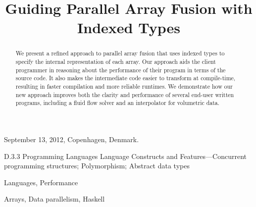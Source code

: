 \documentclass{sigplanconf}
\begin{document}
\title	{Guiding Parallel Array Fusion with Indexed Types}


 {September 13, 2012, Copenhagen, Denmark.}

\maketitle
\makeatactive


\begin{abstract}
We present a refined approach to parallel array fusion that uses indexed types to specify the internal representation of each array. Our approach aids the client programmer in reasoning about the performance of their program in terms of the source code. It also makes the intermediate code easier to transform at compile-time, resulting in faster compilation and more reliable runtimes. We demonstrate how our new approach improves both the clarity and performance of several end-user written programs, including a fluid flow solver and an interpolator for volumetric data.
\end{abstract}

\category
	{D.3.3}
	{Programming Languages}
	{Language Constructs and Features---Concurrent programming structures; Polymorphism; Abstract data types}

\terms
	Languages, Performance

\keywords
	Arrays, Data parallelism, Haskell









\end{document}
